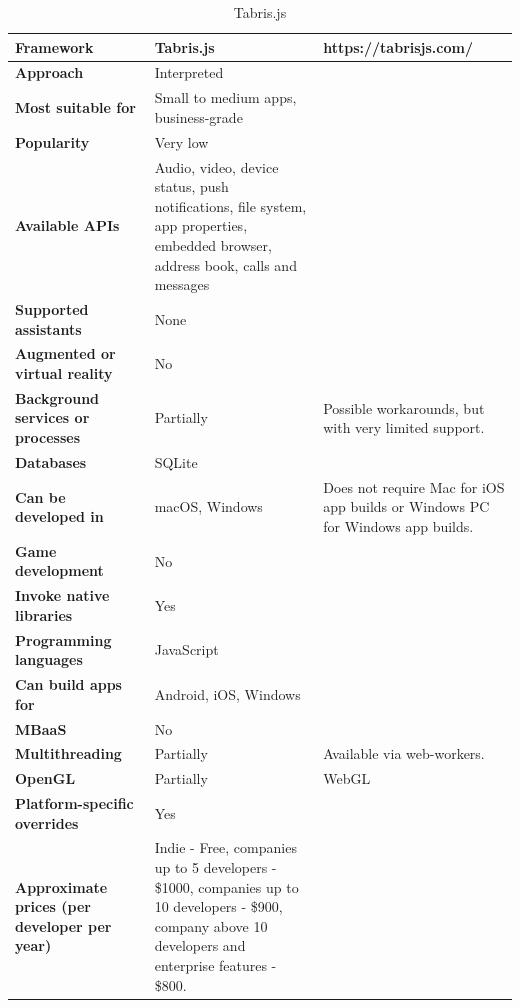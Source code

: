 \documentclass[english,master,public,dept460,male,cpdeclaration,oneside]{diploma}
\begin{document}
\begin{table}[!h]
	\centering
	\caption{Tabris.js}
	\begin{tabular}{p{} | p{} | p{}}
		\toprule		
		\textbf{Framework} & \textbf{Tabris.js} & https://tabrisjs.com/ \\
		\midrule
		\textbf{Approach} & Interpreted & \\			
		\midrule	
		\textbf{Most suitable for} & Small to medium apps, business-grade & \\
		\midrule
		\textbf{Popularity} & Very low & \\			
		\midrule
		\textbf{Available APIs} & Audio, video, device status, push notifications, file system, app properties, embedded browser, address book, calls and messages & \\			
		\midrule
		\textbf{Supported assistants} & None & \\			
		\midrule
		\textbf{Augmented or virtual reality} & No & \\			
		\midrule
		\textbf{Background services or processes} & Partially & Possible workarounds, but with very limited support. \\			
		\midrule
		\textbf{Databases} & SQLite & \\			
		\midrule
		\textbf{Can be developed in} & macOS, Windows & Does not require Mac for iOS app builds or Windows PC for Windows app builds. \\			
		\midrule
		\textbf{Game development} & No & \\			
		\midrule
		\textbf{Invoke native libraries} & Yes & \\			
		\midrule
		\textbf{Programming languages} & JavaScript & \\			
		\midrule
		\textbf{Can build apps for} & Android, iOS, Windows & \\			
		\midrule
		\textbf{MBaaS} & No & \\			
		\midrule
		\textbf{Multithreading} & Partially & Available via web-workers. \\			
		\midrule
		\textbf{OpenGL} & Partially & WebGL \\			
		\midrule
		\textbf{Platform-specific overrides} & Yes & \\			
		\midrule
		\textbf{Approximate prices (per developer per year)} & Indie - Free, companies up to 5 developers - \$1000, companies up to 10 developers - \$900, company above 10 developers and enterprise features - \$800. & \\			
		\midrule
	\end{tabular}
\end{table}
\end{document}
